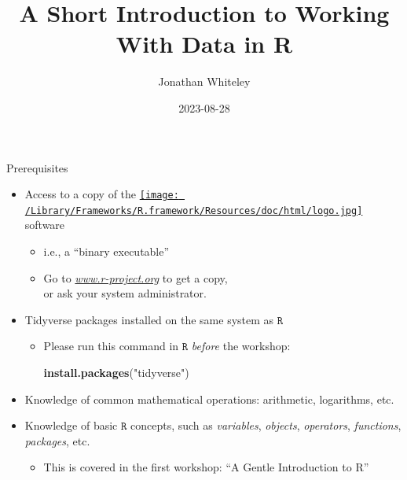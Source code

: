 \documentclass[
  11pt,
  ignorenonframetext,
]{beamer}
\title{A Short Introduction to Working With Data in R}
\author{Jonathan Whiteley}
\date{2023-08-28}
\newenvironment{Shaded}{\begin{snugshade}}{\end{snugshade}}
\newcommand{\FunctionTok}[1]{\textcolor[rgb]{0.13,0.29,0.53}{\textbf{#1}}}
\newcommand{\NormalTok}[1]{#1}
\newcommand{\StringTok}[1]{\textcolor[rgb]{0.31,0.60,0.02}{#1}}
\providecommand{\tightlist}{%
  \setlength{\itemsep}{0pt}\setlength{\parskip}{0pt}}
\newcommand{\R}{\texttt{R}}
\begin{document}
\frame{\titlepage}

\begin{frame}[fragile]{Prerequisites}
\protect\hypertarget{prerequisites}{}
\begin{itemize}
\item
  Access to a copy of the
  \href{https://www.r-project.org}{\texttt{[image: /Library/Frameworks/R.framework/Resources/doc/html/logo.jpg]}}
  software

  \begin{itemize}
  \item
    i.e., a ``binary executable''
  \item
    Go to \href{https://www.r-project.org}{\emph{www.r-project.org}} to
    get a copy,\\
    or ask your system administrator.
  \end{itemize}
\item
  Tidyverse packages installed on the same system as \(\R\)

  \begin{itemize}
  \item
    Please run this command in \(\R\) \emph{before} the workshop:

\begin{Shaded}
\begin{Highlighting}[]
\FunctionTok{install.packages}\NormalTok{(}\StringTok{"tidyverse"}\NormalTok{)}
\end{Highlighting}
\end{Shaded}
  \end{itemize}
\item
  Knowledge of common mathematical operations: arithmetic, logarithms,
  etc.
\item
  Knowledge of basic \(\R\) concepts, such as \emph{variables},
  \emph{objects}, \emph{operators}, \emph{functions}, \emph{packages},
  etc.

  \begin{itemize}
  \tightlist
  \item
    This is covered in the first workshop: ``A Gentle Introduction to
    R''
  \end{itemize}
\end{itemize}
\end{frame}
\end{document}
